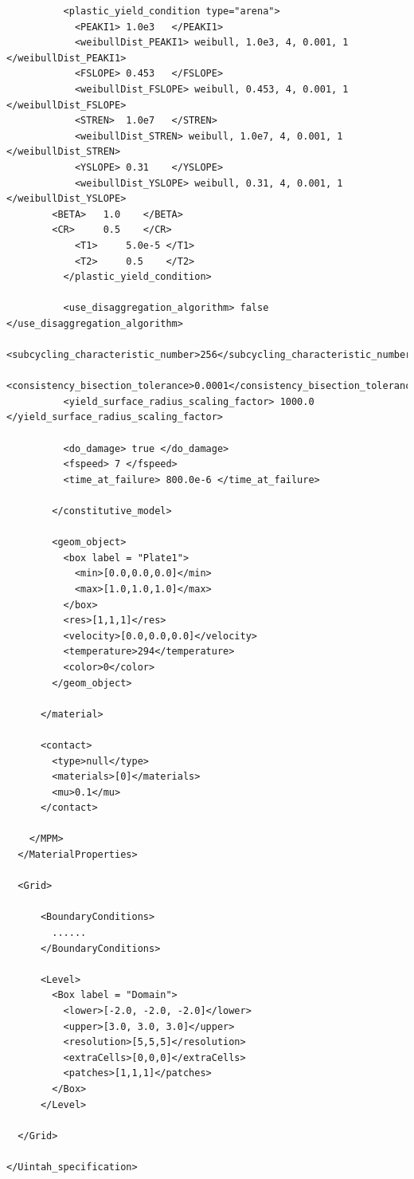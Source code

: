 \documentclass[11pt,a4paper]{article}
\begin{document}
\begin{lstlisting}
          <plastic_yield_condition type="arena">
            <PEAKI1> 1.0e3   </PEAKI1>
            <weibullDist_PEAKI1> weibull, 1.0e3, 4, 0.001, 1 </weibullDist_PEAKI1>
            <FSLOPE> 0.453   </FSLOPE>
            <weibullDist_FSLOPE> weibull, 0.453, 4, 0.001, 1 </weibullDist_FSLOPE>
            <STREN>  1.0e7   </STREN>
            <weibullDist_STREN> weibull, 1.0e7, 4, 0.001, 1 </weibullDist_STREN>
            <YSLOPE> 0.31    </YSLOPE>
            <weibullDist_YSLOPE> weibull, 0.31, 4, 0.001, 1 </weibullDist_YSLOPE>
	    <BETA>   1.0    </BETA>
	    <CR>     0.5    </CR>
            <T1>     5.0e-5 </T1>
            <T2>     0.5    </T2> 
          </plastic_yield_condition>

          <use_disaggregation_algorithm> false </use_disaggregation_algorithm>
	  <subcycling_characteristic_number>256</subcycling_characteristic_number>
          <consistency_bisection_tolerance>0.0001</consistency_bisection_tolerance>
          <yield_surface_radius_scaling_factor> 1000.0 </yield_surface_radius_scaling_factor>

          <do_damage> true </do_damage>
          <fspeed> 7 </fspeed>
          <time_at_failure> 800.0e-6 </time_at_failure>

        </constitutive_model>

        <geom_object>
          <box label = "Plate1">
            <min>[0.0,0.0,0.0]</min>
            <max>[1.0,1.0,1.0]</max>
          </box>
          <res>[1,1,1]</res>
          <velocity>[0.0,0.0,0.0]</velocity>
          <temperature>294</temperature>
          <color>0</color>
        </geom_object>

      </material>

      <contact>
        <type>null</type>
        <materials>[0]</materials>
        <mu>0.1</mu>
      </contact>

    </MPM>
  </MaterialProperties>

  <Grid>

      <BoundaryConditions>                      
        ......
      </BoundaryConditions>

      <Level>
        <Box label = "Domain">
          <lower>[-2.0, -2.0, -2.0]</lower>
          <upper>[3.0, 3.0, 3.0]</upper>
          <resolution>[5,5,5]</resolution>
          <extraCells>[0,0,0]</extraCells>
          <patches>[1,1,1]</patches>
        </Box>
      </Level>

  </Grid>

</Uintah_specification>
\end{lstlisting}
\end{document}
